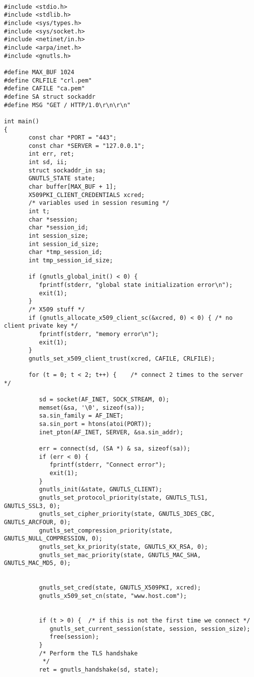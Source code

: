 \begin{verbatim}

#include <stdio.h>
#include <stdlib.h>
#include <sys/types.h>
#include <sys/socket.h>
#include <netinet/in.h>
#include <arpa/inet.h>
#include <gnutls.h>

#define MAX_BUF 1024
#define CRLFILE "crl.pem"
#define CAFILE "ca.pem"
#define SA struct sockaddr
#define MSG "GET / HTTP/1.0\r\n\r\n"

int main()
{
       const char *PORT = "443";
       const char *SERVER = "127.0.0.1";
       int err, ret;
       int sd, ii;
       struct sockaddr_in sa;
       GNUTLS_STATE state;
       char buffer[MAX_BUF + 1];
       X509PKI_CLIENT_CREDENTIALS xcred;
       /* variables used in session resuming */
       int t;
       char *session;
       char *session_id;
       int session_size;
       int session_id_size;
       char *tmp_session_id;
       int tmp_session_id_size;

       if (gnutls_global_init() < 0) {
	      fprintf(stderr, "global state initialization error\n");
	      exit(1);
       }
       /* X509 stuff */
       if (gnutls_allocate_x509_client_sc(&xcred, 0) < 0) {	/* no client private key */
	      fprintf(stderr, "memory error\n");
	      exit(1);
       }
       gnutls_set_x509_client_trust(xcred, CAFILE, CRLFILE);

       for (t = 0; t < 2; t++) {	/* connect 2 times to the server */

	      sd = socket(AF_INET, SOCK_STREAM, 0);
	      memset(&sa, '\0', sizeof(sa));
	      sa.sin_family = AF_INET;
	      sa.sin_port = htons(atoi(PORT));
	      inet_pton(AF_INET, SERVER, &sa.sin_addr);

	      err = connect(sd, (SA *) & sa, sizeof(sa));
	      if (err < 0) {
		     fprintf(stderr, "Connect error");
		     exit(1);
	      }
	      gnutls_init(&state, GNUTLS_CLIENT);
	      gnutls_set_protocol_priority(state, GNUTLS_TLS1, GNUTLS_SSL3, 0);
	      gnutls_set_cipher_priority(state, GNUTLS_3DES_CBC, GNUTLS_ARCFOUR, 0);
	      gnutls_set_compression_priority(state, GNUTLS_NULL_COMPRESSION, 0);
	      gnutls_set_kx_priority(state, GNUTLS_KX_RSA, 0);
	      gnutls_set_mac_priority(state, GNUTLS_MAC_SHA, GNUTLS_MAC_MD5, 0);


	      gnutls_set_cred(state, GNUTLS_X509PKI, xcred);
	      gnutls_x509_set_cn(state, "www.host.com");


	      if (t > 0) {	/* if this is not the first time we connect */
		     gnutls_set_current_session(state, session, session_size);
		     free(session);
	      }
	      /* Perform the TLS handshake
	       */
	      ret = gnutls_handshake(sd, state);


\end{verbatim}
